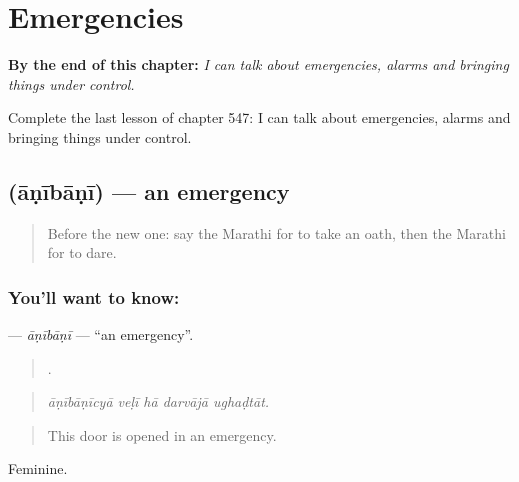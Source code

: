 
\chapter{Emergencies}
\label{ch:mr-emergencies}

\begin{chapteropening}
\textbf{By the end of this chapter:} \emph{I can talk about emergencies, alarms and bringing things under control.}

Complete the last lesson of chapter 547: I can talk about emergencies, alarms and bringing things under control.
\end{chapteropening}

\section[\texorpdfstring{\mr{आणीबाणी} (āṇībāṇī)}{आणीबाणी (āṇībāṇī)}]{ (āṇībāṇī) — an emergency}

\label{lesson:MR-C547-anibani}



\begin{quote}
Before the new one: say the Marathi for to take an oath, then the Marathi for to dare.
\end{quote}

\subsection*{You'll want to know: }
\textbf{} — \emph{āṇībāṇī} — \textquotedblleft{}an emergency\textquotedblright{}.

\begin{quote}
    .
\end{quote}

\begin{quote}
\emph{āṇībāṇīcyā veḷī hā darvājā ughaḍtāt.}
\end{quote}

\begin{quote}
This door is opened in an emergency.
\end{quote}

Feminine.

